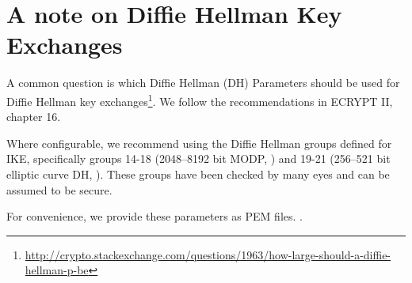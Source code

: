 \section{A note on Diffie Hellman Key Exchanges}
\label{section:DH}

A common question is which Diffie Hellman (DH) Parameters  should be used for Diffie Hellman key exchanges\footnote{\url{http://crypto.stackexchange.com/questions/1963/how-large-should-a-diffie-hellman-p-be}}. We follow the recommendations in ECRYPT II, chapter 16.\cite{ii2011ecrypt}

Where configurable, we recommend using the Diffie Hellman groups
defined for IKE, specifically groups 14-18 (2048--8192 bit MODP, \cite{rfc3526})
and 19-21 (256--521 bit elliptic curve DH, \cite{rfc5903}). These groups have
been checked by many eyes and can be assumed to be secure.

For convenience, we provide these parameters as PEM files. .
